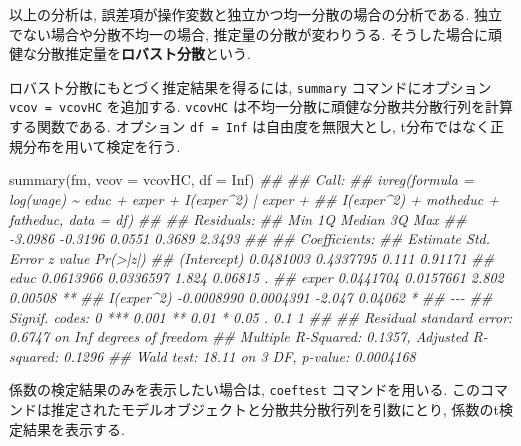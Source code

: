 \documentclass[
  letterpaper,
  xelatex,
  ja=standard, xelatex]{bxjsbook}
\newenvironment{Shaded}{\begin{snugshade}}{\end{snugshade}}
\newcommand{\AttributeTok}[1]{\textcolor[rgb]{0.40,0.45,0.13}{#1}}
\newcommand{\ConstantTok}[1]{\textcolor[rgb]{0.56,0.35,0.01}{#1}}
\newcommand{\DocumentationTok}[1]{\textcolor[rgb]{0.37,0.37,0.37}{\textit{#1}}}
\newcommand{\FunctionTok}[1]{\textcolor[rgb]{0.28,0.35,0.67}{#1}}
\newcommand{\NormalTok}[1]{\textcolor[rgb]{0.00,0.23,0.31}{#1}}
\begin{document}
以上の分析は, 誤差項が操作変数と独立かつ均一分散の場合の分析である.
独立でない場合や分散不均一の場合, 推定量の分散が変わりうる.
そうした場合に頑健な分散推定量を\textbf{ロバスト分散}という.

ロバスト分散にもとづく推定結果を得るには, \texttt{summary}
コマンドにオプション \texttt{vcov\ =\ vcovHC} を追加する.
\texttt{vcovHC} は不均一分散に頑健な分散共分散行列を計算する関数である.
オプション \texttt{df\ =\ Inf} は自由度を無限大とし,
t分布ではなく正規分布を用いて検定を行う.

\begin{Shaded}
\begin{Highlighting}[]
\FunctionTok{summary}\NormalTok{(fm, }\AttributeTok{vcov =}\NormalTok{ vcovHC, }\AttributeTok{df =} \ConstantTok{Inf}\NormalTok{)}
\DocumentationTok{\#\# }
\DocumentationTok{\#\# Call:}
\DocumentationTok{\#\# ivreg(formula = log(wage) \textasciitilde{} educ + exper + I(exper\^{}2) | exper + }
\DocumentationTok{\#\#     I(exper\^{}2) + motheduc + fatheduc, data = df)}
\DocumentationTok{\#\# }
\DocumentationTok{\#\# Residuals:}
\DocumentationTok{\#\#     Min      1Q  Median      3Q     Max }
\DocumentationTok{\#\# {-}3.0986 {-}0.3196  0.0551  0.3689  2.3493 }
\DocumentationTok{\#\# }
\DocumentationTok{\#\# Coefficients:}
\DocumentationTok{\#\#               Estimate Std. Error z value Pr(\textgreater{}|z|)   }
\DocumentationTok{\#\# (Intercept)  0.0481003  0.4337795   0.111  0.91171   }
\DocumentationTok{\#\# educ         0.0613966  0.0336597   1.824  0.06815 . }
\DocumentationTok{\#\# exper        0.0441704  0.0157661   2.802  0.00508 **}
\DocumentationTok{\#\# I(exper\^{}2)  {-}0.0008990  0.0004391  {-}2.047  0.04062 * }
\DocumentationTok{\#\# {-}{-}{-}}
\DocumentationTok{\#\# Signif. codes:  0 \textquotesingle{}***\textquotesingle{} 0.001 \textquotesingle{}**\textquotesingle{} 0.01 \textquotesingle{}*\textquotesingle{} 0.05 \textquotesingle{}.\textquotesingle{} 0.1 \textquotesingle{} \textquotesingle{} 1}
\DocumentationTok{\#\# }
\DocumentationTok{\#\# Residual standard error: 0.6747 on Inf degrees of freedom}
\DocumentationTok{\#\# Multiple R{-}Squared: 0.1357,  Adjusted R{-}squared: 0.1296 }
\DocumentationTok{\#\# Wald test: 18.11 on 3 DF,  p{-}value: 0.0004168}
\end{Highlighting}
\end{Shaded}

係数の検定結果のみを表示したい場合は, \texttt{coeftest}
コマンドを用いる.
このコマンドは推定されたモデルオブジェクトと分散共分散行列を引数にとり,
係数のt検定結果を表示する.
\end{document}
